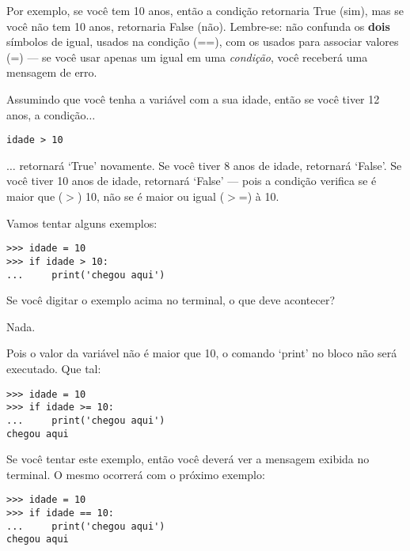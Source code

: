Por exemplo, se você tem 10 anos, então a condição  retornaria True (sim), mas se você não tem 10 anos, retornaria False (não). Lembre-se: não confunda os \textbf{dois} símbolos de igual, usados na condição (==), com os usados para associar valores (=) --- se você usar apenas um igual em uma \emph{condição}, você receberá uma mensagem de erro.
\par
Assumindo que você tenha a variável  com a sua idade, então se você tiver 12 anos, a condição$\ldots$

\begin{listing}
\begin{verbatim}
idade > 10
\end{verbatim}
\end{listing}

$\ldots$ retornará `True' novamente. Se você tiver 8 anos de idade, retornará `False'. Se você tiver 10 anos de idade, retornará `False' --- pois a condição verifica se é maior que ($>$) 10, não se é maior ou igual ($>$=) à 10.

Vamos tentar alguns exemplos:

\begin{listing}
\begin{verbatim}
>>> idade = 10
>>> if idade > 10:
...     print('chegou aqui')
\end{verbatim}
\end{listing}

\noindent
Se você digitar o exemplo acima no terminal, o que deve acontecer?
\par
\noindent
Nada.
\par
\noindent
Pois o valor da variável  não é maior que 10, o comando `print' no bloco não será executado. Que tal:

\begin{listingignore}
\begin{verbatim}
>>> idade = 10
>>> if idade >= 10:
...     print('chegou aqui')
chegou aqui
\end{verbatim}
\end{listingignore}

Se você tentar este exemplo, então você deverá ver a mensagem exibida no terminal. O mesmo ocorrerá com o próximo exemplo:

\begin{listing}
\begin{verbatim}
>>> idade = 10
>>> if idade == 10:
...     print('chegou aqui')
chegou aqui
\end{verbatim}
\end{listing}

